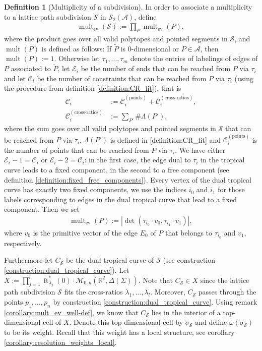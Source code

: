 \documentclass[11pt,reqno,a4]{amsart}
\theoremstyle{dotless}
\theoremstyle{definition}
\newtheorem{definition}[corollary]{Definition}
\newcommand{\mult}{\operatorname{mult}}
\newcommand{\ft}{\operatorname{ft}}
\newcommand{\ev}{\operatorname{ev}}
\begin{document}
\begin{definition}[Multiplicity of a subdivision]
In order to associate a multiplicity to a lattice path subdivision $\mathcal{S}$ in $\mathcal{S}_2(\mathcal{A})$, define
\begin{align*}
\mult_{\ev}(\mathcal{S}):=\prod_{P} \mult_{\ev}(P),
\end{align*}
where the product goes over all valid polytopes and pointed segments in $\mathcal{S}$, and $\mult(P)$ is defined as follows: If $\tilde{P}$ is $0$-dimensional or $P\in\mathcal{A}$, then $\mult(P):=1$. Otherwise let $\tau_1,\dots,\tau_m$ denote the entries of labelings of edges of $P$ associated to $\tilde{P}$, let $\mathcal{E}_i$ be the number of ends that can be reached from $P$ via $\tau_i$ and let $\mathcal{C}_i$ be the number of constraints that can be reached from $P$ via $\tau_i$ (using the procedure from definition \ref{definition:CR_fit}), that is
\begin{align*}
\mathcal{C}_i&:=\mathcal{C}_i^{\left(\textrm{points}\right)}+\mathcal{C}_i^{\left(\textrm{cross-ratios}\right)},\\
\mathcal{C}_i^{\left(\textrm{cross-ratios}\right)}&:= \sum_{P'} \#\Lambda(P'),
\end{align*}
where the sum goes over all valid polytopes and pointed segments in $\mathcal{S}$ that can be reached from $P$ via $\tau_i$, $\Lambda(P')$ is defined in \ref{definition:CR_fit} and $\mathcal{C}_i^{\left(\textrm{points}\right)}$ is the number of points that can be reached from $P$ via $\tau_i$. We have either $\mathcal{E}_i-1=\mathcal{C}_i$ or
$\mathcal{E}_i-2=\mathcal{C}_i$: in the first case, the edge dual to $\tau_i$ in the tropical curve leads to a fixed component, in the second to a free component (see definition \ref{definition:fixed_free_components}). Every vertex of the dual tropical curve has exactly two fixed components, we use the indices $i_0$ and $i_1$ for those labels corresponding to edges in the dual tropical curve that lead to a fixed component. Then we set
\begin{align*}
\mult_{\ev}(P):=|\det\left(\tau_{i_0}\cdot v_0, \tau_{i_1}\cdot v_1 \right)|,
\end{align*}
where $v_0$ is the primitive vector of the edge $E_0$ of $P$ that belongs to $\tau_{i_0}$ and $v_1$, respectively.

Furthermore let $C_\mathcal{S}$ be the dual tropical curve of $\mathcal{S}$ (see construction \ref{construction:dual_tropical_curve}). Let $X:=\prod_{j=1}^{l}\ft_{\lambda_j}^*\left( 0\right)\cdot\mathcal{M}_{0,n}\left(\mathbb{R}^2,\Delta(\Sigma) \right)$. Note that $C_\mathcal{S}\in X$ since the lattice path subdivision $\mathcal{S}$ fits the cross-ratios $\lambda_1,\dots,\lambda_l$. Moreover, $C_\mathcal{S}$ passes through the points $p_1,\dots,p_n$ by construction \ref{construction:dual_tropical_curve}. Using remark \ref{corollary:mult_ev_well-def}, we know that $C_\mathcal{S}$ lies in the interior of a top-dimensional cell of $X$. Denote this top-dimensional cell by $\sigma_\mathcal{S}$ and define $\omega (\sigma_\mathcal{S})$ to be its weight. Recall that this weight has a local structure, see corollary \ref{corollary:resolution_weights_local}.


\end{definition}
\end{document}
